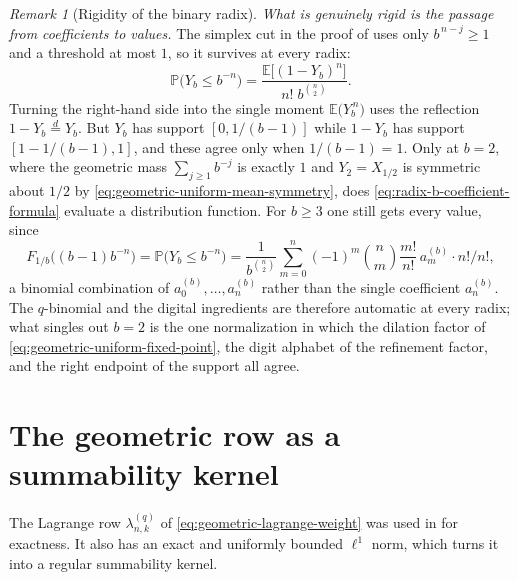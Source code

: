 \documentclass[11pt,oneside,openany]{book}
\theoremstyle{definition}
\theoremstyle{remark}
\newtheorem{remark}[remark]{Remark}
\begin{document}
\begin{remark}[Rigidity of the binary radix]
\emph{What is genuinely rigid is the passage from coefficients to values.}  The simplex cut in the proof of  uses only $b^{\,n-j}\ge1$ and a threshold at most $1$, so it survives at every radix:
\[
 \mathbb P\bigl(Y_b\le b^{-n}\bigr)
 =\frac{\mathbb E\bigl[(1-Y_b)^n\bigr]}{n!\;b^{\binom n2}} .
\]
Turning the right-hand side into the single moment $\mathbb E\bigl(Y_b^{\,n}\bigr)$ uses the reflection $1-Y_b\overset d=Y_b$.  But $Y_b$ has support $[0,1/(b-1)]$ while $1-Y_b$ has support $[1-1/(b-1),1]$, and these agree only when $1/(b-1)=1$.  Only at $b=2$, where the geometric mass $\sum_{j\ge1}b^{-j}$ is exactly $1$ and $Y_2=X_{1/2}$ is symmetric about $1/2$ by \eqref{eq:geometric-uniform-mean-symmetry}, does \eqref{eq:radix-b-coefficient-formula} evaluate a distribution function.  For $b\ge3$ one still gets every value, since
\[
 F_{1/b}\bigl((b-1)b^{-n}\bigr)
 =\mathbb P\bigl(Y_b\le b^{-n}\bigr)
 =\frac1{b^{\binom n2}}\sum_{m=0}^{n}(-1)^m\binom nm\frac{m!}{n!}\,a^{(b)}_m\cdot n!\Big/n!,
\]
a binomial combination of $a^{(b)}_0,\ldots,a^{(b)}_n$ rather than the single coefficient $a^{(b)}_n$.  The $q$-binomial and the digital ingredients are therefore automatic at every radix; what singles out $b=2$ is the one normalization in which the dilation factor of \eqref{eq:geometric-uniform-fixed-point}, the digit alphabet of the refinement factor, and the right endpoint of the support all agree.
\end{remark}

\section{The geometric row as a summability kernel}

The Lagrange row $\lambda_{n,k}^{(q)}$ of \eqref{eq:geometric-lagrange-weight} was used
in  for exactness.  It also has an exact and uniformly
bounded $\ell^1$ norm, which turns it into a regular summability kernel.
\end{document}
